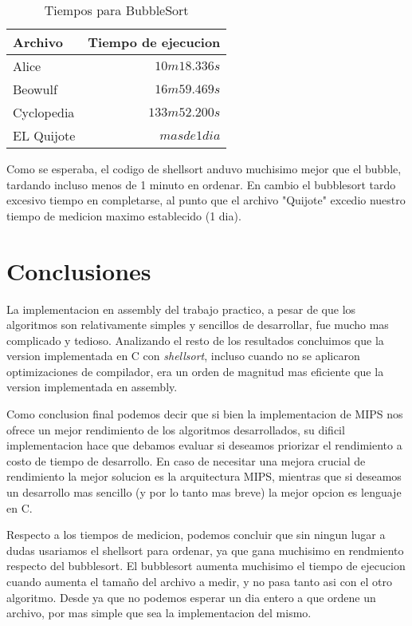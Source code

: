 \documentclass[a4paper,11pt]{article}
\begin{document}
\FloatBarrier

\begin{table}[h!t]
\centering
\begin{tabular}{ | l | r | }
  \hline
  Archivo          & Tiempo de ejecucion \\ \hline
  Alice				 & \(10m18.336s\) \\
  Beowulf     & \(16m59.469s\) \\
  Cyclopedia     & \(133m52.200s\) \\
  EL Quijote      & \(mas de 1 dia\) \\
  \hline
\end{tabular}
\caption{Tiempos para BubbleSort}
\label{tab:resultados}
\end{table}

\FloatBarrier

Como se esperaba, el codigo de shellsort anduvo muchisimo mejor que el bubble, tardando incluso menos de 1 minuto en ordenar. En cambio el bubblesort tardo excesivo tiempo en completarse, al punto que el archivo "Quijote" excedio nuestro tiempo de medicion maximo establecido (1 dia).

\section{Conclusiones}

La implementacion en assembly del trabajo practico, a pesar de que los algoritmos son relativamente simples y sencillos de desarrollar, fue
mucho mas complicado y tedioso. 
Analizando el resto de los resultados concluimos que la version implementada en
C con \textit{shellsort}, incluso cuando no se aplicaron optimizaciones de
compilador, era un orden de magnitud mas eficiente que la version implementada
en assembly. 

Como conclusion final podemos decir que si bien la implementacion de MIPS nos ofrece un mejor rendimiento de los algoritmos desarrollados, su dificil implementacion hace que debamos evaluar si deseamos priorizar el rendimiento a costo de tiempo de desarrollo. En caso de necesitar una mejora crucial de rendimiento la mejor solucion es la arquitectura MIPS, mientras que si deseamos un desarrollo mas sencillo (y por lo tanto mas breve) la mejor opcion es lenguaje en C.

Respecto a los tiempos de medicion, podemos concluir que sin ningun lugar a dudas usariamos el shellsort para ordenar, ya que gana muchisimo en rendmiento respecto del bubblesort. El bubblesort aumenta muchisimo el tiempo de ejecucion cuando aumenta el tamaño del archivo a medir, y no pasa tanto asi con el otro algoritmo. Desde ya que no podemos esperar un dia entero a que ordene un archivo, por mas simple que sea la implementacion del mismo.
\end{document}
